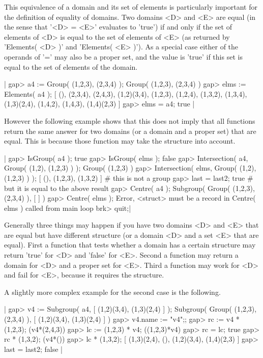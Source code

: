 This equivalence  of  a domain  and its  set of elements is  particularly
important for the definition of equality of domains.  Two domains <D> and
<E> are equal (in the sense that '<D>  = <E>' evaluates to 'true') if and
only if the set of elements of <D> is equal to the set of elements of <E>
(as returned by 'Elements(  <D> )' and 'Elements( <E> )').   As a special
case either  of  the  operands of '='  may also be a proper set,  and the
value  is  'true' if  this set  is equal  to the  set of elements of  the
domain.

|    gap> a4 := Group( (1,2,3), (2,3,4) );
    Group( (1,2,3), (2,3,4) )
    gap> elms := Elements( a4 );
    [ (), (2,3,4), (2,4,3), (1,2)(3,4), (1,2,3), (1,2,4), (1,3,2),
      (1,3,4), (1,3)(2,4), (1,4,2), (1,4,3), (1,4)(2,3) ]
    gap> elms = a4;
    true |

However the  following example shows  that this does not  imply  that all
functions  return  the same  answer  for two  domains (or a domain  and a
proper set) that are equal.   This is because those function may take the
structure into account.

|    gap> IsGroup( a4 );
    true
    gap> IsGroup( elms );
    false
    gap> Intersection( a4, Group( (1,2), (1,2,3) ) );
    Group( (1,2,3) )
    gap> Intersection( elms, Group( (1,2), (1,2,3) ) );
    [ (), (1,2,3), (1,3,2) ]    # this is not a group
    gap> last = last2;
    true                        # but it is equal to the above result
    gap> Centre( a4 );
    Subgroup( Group( (1,2,3), (2,3,4) ), [  ] )
    gap> Centre( elms );
    Error, <struct> must be a record in
    Centre( elms ) called from
    main loop
    brk> quit;|

Generally three  things  may  happen if you have two domains <D>  and <E>
that are equal but have different structure (or a  domain <D>  and a  set
<E> that are equal).  First a  function that tests whether a domain has a
certain structure may return 'true' for <D> and 'false' for <E>.   Second
a function may return a domain for <D> and a proper set for <E>.  Third a
function may work  for  <D> and fail for  <E>,  because  it  requires the
structure.

A slightly more complex example for the second case is the following.

|    gap> v4 := Subgroup( a4, [ (1,2)(3,4), (1,3)(2,4) ] );
    Subgroup( Group( (1,2,3), (2,3,4) ), [ (1,2)(3,4), (1,3)(2,4) ] )
    gap> v4.name := "v4";;
    gap> rc := v4 * (1,2,3);
    (v4*(2,4,3))
    gap> lc := (1,2,3) * v4;
    ((1,2,3)*v4)
    gap> rc = lc;
    true
    gap> rc * (1,3,2);
    (v4*())
    gap> lc * (1,3,2);
    [ (1,3)(2,4), (), (1,2)(3,4), (1,4)(2,3) ]
    gap> last = last2;
    false |


